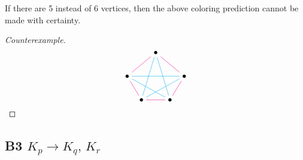 \documentclass[12pt]{article}
\begin{document}
\begin{theorem}
    If there are 5 instead of 6 vertices, then the above coloring prediction cannot be made with certainty.
\end{theorem}
\begin{proof}[Counterexample]
    \[\begin{tikzcd}[ampersand replacement=\&,cramped,column sep=tiny]
        \&\& \bullet \\
        \bullet \&\&\&\& \bullet \\
        \& \bullet \&\& \bullet
        \arrow[color=magenta, no head, from=1-3, to=2-1]
        \arrow[color=cyan, no head, from=2-1, to=2-5]
        \arrow[color=magenta, no head, from=1-3, to=2-5]
        \arrow[color=cyan, no head, from=1-3, to=3-2]
        \arrow[color=cyan, no head, from=1-3, to=3-4]
        \arrow[color=magenta, no head, from=2-1, to=3-2]
        \arrow[color=magenta, no head, from=3-2, to=3-4]
        \arrow[color=magenta, no head, from=3-4, to=2-5]
        \arrow[color=cyan, no head, from=3-2, to=2-5]
        \arrow[color=cyan, no head, from=2-1, to=3-4]
    \end{tikzcd}\]
\end{proof}


\subsection{B3 $K_p\to K_q,\, K_r$}
\end{document}
